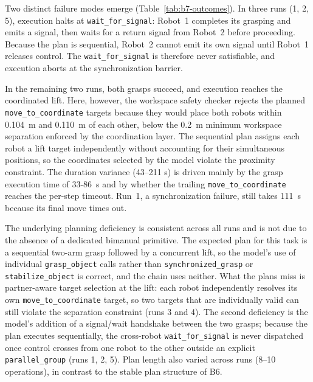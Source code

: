 \documentclass[
     12pt,
     a4paper,
     BCOR=10mm,
     DIV=14,
     listof=totoc,
     bibliography=totoc,
     parskip,
     twoside,
     headsepline
     ]{scrreprt}
\begin{document}
Two distinct failure modes emerge (Table~\ref{tab:b7-outcomes}). In three runs (1, 2, 5), execution halts at \texttt{wait\_for\_signal}: Robot~1 completes its grasping and emits a signal, then waits for a return signal from Robot~2 before proceeding. Because the plan is sequential, Robot~2 cannot emit its own signal until Robot~1 releases control. The \texttt{wait\_for\_signal} is therefore never satisfiable, and execution aborts at the synchronization barrier.

In the remaining two runs, both grasps succeed, and execution reaches the coordinated lift. Here, however, the workspace safety checker rejects the planned \texttt{move\_to\_coordinate} targets because they would place both robots within 0.104~m and 0.110~m of each other, below the 0.2~m minimum workspace separation enforced by the coordination layer. The sequential plan assigns each robot a lift target independently without accounting for their simultaneous positions, so the coordinates selected by the model violate the proximity constraint. The duration variance (43--211 s) is driven mainly by the grasp execution time of 33-86~s and by whether the trailing \texttt{move\_to\_coordinate} reaches the per-step timeout. Run~1, a synchronization failure, still takes 111~s because its final move times out.

The underlying planning deficiency is consistent across all runs and is not due to the absence of a dedicated bimanual primitive. The expected plan for this task is a sequential two-arm grasp followed by a concurrent lift, so the model's use of individual \texttt{grasp\_object} calls rather than \texttt{synchronized\_grasp} or \texttt{stabilize\_object} is correct, and the chain uses neither. What the plans miss is partner-aware target selection at the lift: each robot independently resolves its own \texttt{move\_to\_coordinate} target, so two targets that are individually valid can still violate the separation constraint (runs 3 and 4). The second deficiency is the model's addition of a signal/wait handshake between the two grasps; because the plan executes sequentially, the cross-robot \texttt{wait\_for\_signal} is never dispatched once control crosses from one robot to the other outside an explicit \texttt{parallel\_group} (runs 1, 2, 5). Plan length also varied across runs (8--10 operations), in contrast to the stable plan structure of B6.
\end{document}
